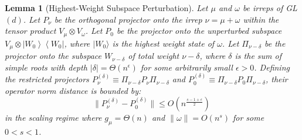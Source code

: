 \documentclass[11pt,letterpaper]{article}
\newtheorem{lem}{Lemma}
\newcommand{\ket}[1]{| #1 \rangle}
\newcommand{\ketbra}[2]{\left|#1\right\rangle\!\!\left\langle #2\right|}
\begin{document}
\begin{lem}[Highest-Weight Subspace Perturbation]\label{lem:perturbation}
    Let $\mu$ and $\omega$ be irreps of GL$(d)$.  Let $P_\nu$ be the orthogonal projector onto the irrep $\nu = \mu + \omega$ within the tensor product $V_\mu \otimes V_\omega$. Let $P_0$ be the projector onto the unperturbed subspace $V_\mu \otimes \ketbra{W_0}{W_0}$, where $\ket{W_0}$ is the highest weight state of $\omega$. Let $\Pi_{\nu-\delta}$ be the projector onto the subspace $W_{\nu-\delta}$ of total weight $\nu - \delta$, where $\delta$ is the sum of simple roots with depth $|\delta| =\Theta(n^\epsilon)$ for some arbitrarily small $\epsilon>0$. Defining the restricted projectors $P_\nu^{(\delta)} \equiv \Pi_{\nu-\delta} P_\nu \Pi_{\nu-\delta}$ and $P_0^{(\delta)} \equiv \Pi_{\nu-\delta} P_0 \Pi_{\nu-\delta}$, their operator norm distance is bounded by:
    \begin{equation}
        \|P_\nu^{(\delta)} - P_0^{(\delta)}\| \le O\left(n^{\frac{s-1+\epsilon}{2}} \right) \ 
    \end{equation}
    in the scaling regime where $g_\mu = \Theta(n)$ and $\|\omega\| = O(n^s)$ for some $0 < s < 1$. 
\end{lem}
\end{document}
